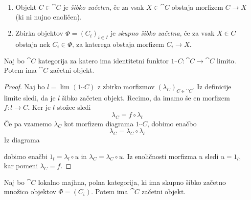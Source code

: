 \begin{definicija}
\mbox{}
\begin{enumerate}[label=(\roman*)]
\item Objekt $C \in \cat{C}$ je \emph{šibko začeten}, če za vsak $X \in \cat{C}$ obstaja morfizem $C \to X$ (ki ni nujno enoličen).
\item Zbirka objektov $\Phi = (C_i)_{i \in I}$ je \emph{skupno šibko začetna}, če za vsak $X \in C$ obstaja nek $C_i \in \Phi$, za katerega obstaja morfizem $C_i \to X$.
\end{enumerate}
\end{definicija}
\begin{lema}
Naj bo $\cat{C}$ kategorija za katero ima identitetni funktor $1_\cat{C} : \cat{C} \to \cat{C}$ limito. Potem ima $\cat{C}$ začetni objekt.
\end{lema}
\begin{proof}
Naj bo $l = \lim (1_\cat{C})$ z zbirko morfizmov $(\lambda_C)_{C \in \cat{C}}$. Iz definicije limite sledi, da je $l$ šibko začeten objekt. Recimo, da imamo še en morfizem $f : l \to C$. Ker je $l$ stožec sledi
$$ \lambda_C  = f \circ \lambda_l$$
Če pa vzamemo $\lambda_C$ kot morfizem diagrama $1_\cat{C}$, dobimo enačbo
$$\lambda_C = \lambda_C \circ \lambda_l$$
Iz diagrama
\begin{center}
\end{center}
dobimo enačbi $1_l = \lambda_l \circ u$ in $\lambda_C = \lambda_C \circ u$. Iz enoličnosti morfizma $u$ sledi $u = 1_l$, kar pomeni $\lambda_C = f$.
\end{proof}
\begin{lema} \label{lema1}
Naj bo $\cat{C}$ lokalno majhna, polna kategorija, ki ima skupno šibko začetno množico objektov $\Phi = (C_i)$. Potem ima $\cat{C}$ začetni objekt.
\end{lema}
